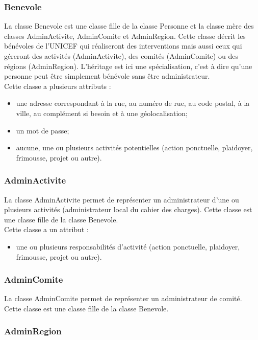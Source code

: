 \subsubsection*{Benevole}

La classe Benevole est une classe fille de la classe Personne et la classe mère des classes AdminActivite, AdminComite et AdminRegion. Cette classe décrit les bénévoles de l'UNICEF qui réaliseront des interventions mais aussi ceux qui géreront des activités (AdminActivite), des comités (AdminComite) ou des régions (AdminRegion). L'héritage est ici une spécialisation, c'est à dire qu'une personne peut être simplement bénévole sans être administrateur. \\
Cette classe a plusieurs attributs : 
\begin{itemize}
\item une adresse correspondant à la rue, au numéro de rue, au code postal, à la ville, au complément si besoin et à une géolocalisation;
\item un mot de passe;
\item aucune, une ou plusieurs activités potentielles (action ponctuelle, plaidoyer, frimousse, projet ou autre).
\end{itemize}

\subsubsection*{AdminActivite}

La classe AdminActivite permet de représenter un administrateur d'une ou plusieurs activités (administrateur local du cahier des charges). Cette classe est une classe fille de la classe Benevole.\\
Cette classe a un attribut :
\begin{itemize}
\item une ou plusieurs responsabilités d'activité (action ponctuelle, plaidoyer, frimousse, projet ou autre). 
\end{itemize}

\subsubsection*{AdminComite}

La classe AdminComite permet de représenter un administrateur de comité. Cette classe est une classe fille de la classe Benevole. 

\subsubsection*{AdminRegion}

